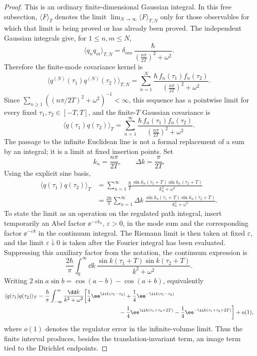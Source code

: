 \begin{proof}
This is an ordinary finite-dimensional Gaussian integral.  In this free
subsection, \(\langle F\rangle_T\) denotes the limit
\(\lim_{N\to\infty}\langle F\rangle_{T,N}\) only for those observables for
which that limit is being proved or has already been proved.  The independent
Gaussian integrals give, for \(1\le n,m\le N\),
\[
  \langle q_nq_m\rangle_{T,N}
  =
  \delta_{nm}\,
  \frac{\hbar}{
    \left(\frac{n\pi}{2T}\right)^2+\omega^2
  }.
\]
Therefore the finite-mode covariance kernel is
\[
  \langle q^{(N)}(\tau_1)q^{(N)}(\tau_2)\rangle_{T,N}
  =
  \sum_{n=1}^{N}
  \frac{\hbar\,f_n(\tau_1)f_n(\tau_2)}
       {\left(\frac{n\pi}{2T}\right)^2+\omega^2}.
\]
Since \(\sum_{n\ge1}((n\pi/2T)^2+\omega^2)^{-1}<\infty\), this sequence has
a pointwise limit for every fixed \(\tau_1,\tau_2\in[-T,T]\), and the
finite-\(T\) Gaussian covariance is
\[
  \langle q(\tau_1)q(\tau_2)\rangle_T
  =
  \sum_{n=1}^{\infty}
  \frac{\hbar\,f_n(\tau_1)f_n(\tau_2)}
       {\left(\frac{n\pi}{2T}\right)^2+\omega^2}.
\]
The passage to the infinite Euclidean line is not a formal replacement of a
sum by an integral; it is a limit at fixed insertion points.  Set
\[
  k_n=\frac{n\pi}{2T},
  \qquad
  \Delta k=\frac{\pi}{2T}.
\]
Using the explicit sine basis,
\[
\begin{aligned}
  \langle q(\tau_1)q(\tau_2)\rangle_T
  &=
  \sum_{n=1}^{\infty}
  \frac{\hbar}{T}
  \frac{
    \sin k_n(\tau_1+T)\sin k_n(\tau_2+T)
  }{k_n^2+\omega^2}  \\
  &=
  \frac{2\hbar}{\pi}
  \sum_{n=1}^{\infty}\Delta k\,
  \frac{
    \sin k_n(\tau_1+T)\sin k_n(\tau_2+T)
  }{k_n^2+\omega^2}.
\end{aligned}
\]
To state the limit as an operation on the regulated path integral, insert
temporarily an Abel factor \(\ee^{-\varepsilon k_n}\), \(\varepsilon>0\), in
the mode sum and the corresponding factor \(\ee^{-\varepsilon k}\) in the
continuum integral.  The Riemann limit is then taken at fixed
\(\varepsilon\), and the limit \(\varepsilon\downarrow0\) is taken after the
Fourier integral has been evaluated.  Suppressing this auxiliary factor from
the notation, the continuum expression is
\[
  \frac{2\hbar}{\pi}
  \int_{0}^{\infty}\dd k\,
  \frac{
    \sin k(\tau_1+T)\sin k(\tau_2+T)
  }{k^2+\omega^2}.
\]
Writing \(2\sin a\sin b=\cos(a-b)-\cos(a+b)\), equivalently
\[
\begin{aligned}
  \langle q(\tau_1)q(\tau_2)\rangle_T
  &=
  \frac{\hbar}{\pi}
  \int_{-\infty}^{\infty}\frac{\dd k}{k^2+\omega^2}
  \biggl[
    \frac14\ee^{\ii k(\tau_1-\tau_2)}
    +\frac14\ee^{-\ii k(\tau_1-\tau_2)}  \\
  &\hspace{5.0cm}
    -\frac14\ee^{\ii k(\tau_1+\tau_2+2T)}
    -\frac14\ee^{-\ii k(\tau_1+\tau_2+2T)}
  \biggr]
  +o(1),
\end{aligned}
\]
where \(o(1)\) denotes the regulator error in the infinite-volume limit.
Thus the finite interval produces, besides the translation-invariant term, an
image term tied to the Dirichlet endpoints.


\end{proof}

